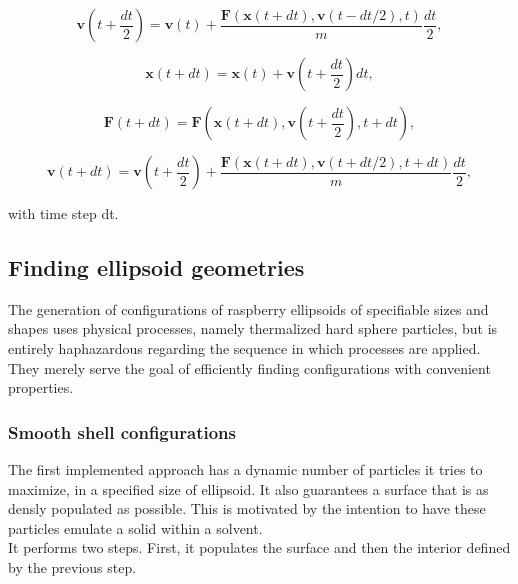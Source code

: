 \documentclass[12pt, DIV=12]{scrartcl}
\begin{document}
\begin{equation}
    \mathbf{v}(t + \frac{d t}{2}) = \mathbf{v}(t) + \frac{\mathbf{F}(\mathbf{x}(t + d t), \mathbf{v}(t - d t/2),t)}{m}\frac{d t}{2},
    \label{eqn_7}
\end{equation}

\begin{equation}
    \mathbf{x}(t + d t) = \mathbf{x}(t) + \mathbf{v}(t + \frac{d t}{2}) dt,
    \label{eqn_8}
\end{equation}

\begin{equation}
    \mathbf{F}(t + d t) = \mathbf{F}(\mathbf{x}(t + d t), \mathbf{v}(t + \frac{dt}{2}),t + d t),
    \label{eqn_9}
\end{equation}

\begin{equation}
    \mathbf{v}(t + d t) = \mathbf{v}(t + \frac{d t}{2}) + \frac{\mathbf{F}(\mathbf{x}(t + d t), \mathbf{v}(t + d t/2), t + dt)}{m}\frac{d t}{2},
    \label{eqn_10}
\end{equation}

with  time step dt.

\subsection{Finding ellipsoid geometries}
The generation of configurations of raspberry ellipsoids of specifiable sizes and shapes uses physical processes, namely thermalized hard sphere particles, but is entirely haphazardous regarding the sequence in which processes are applied. They merely serve the goal of efficiently finding configurations with convenient properties.

\subsubsection{Smooth shell configurations}
The first implemented approach has a dynamic number of particles it tries to maximize, in a specified size of ellipsoid. It also guarantees a surface that is as densly populated as possible. This is motivated by the intention to have these particles emulate a solid within a solvent.\\
It performs two steps. First, it populates the surface and then the interior defined by the previous step.
\end{document}
